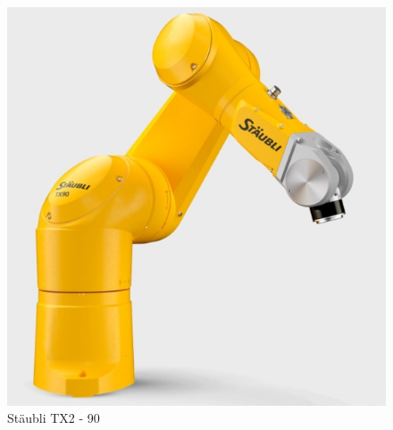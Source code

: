 \documentclass[ a4paper,
                oneside,
                toc=bibliography,
                toc=listof
                ]{scrbook}
\begin{document}
   	\begin{figure}[!ht]
   		\centering
   		\includegraphics[width=0.50\linewidth]{./images/X90.png}
   		\caption{Stäubli TX2 - 90 \cite{X90}} 
   		\label{fig:TX90}
   	\end{figure}
   	\\
\end{document}
